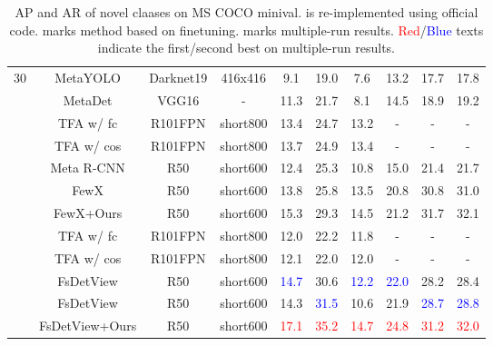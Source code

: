 \documentclass[10pt,twocolumn,letterpaper]{article}
\begin{document}
\begin{table*}
\begin{center}
\begin{tabular}{|c|c|c|c|c|c|c|c|c|c|}
\multirow{11}{*}{30} &  MetaYOLO \cite{kang2019few}   & Darknet19 & 416x416 & 9.1 & 19.0 & 7.6 & 13.2 & 17.7 & 17.8 \\
& MetaDet \cite{wang2019meta}  & VGG16 & - & 11.3 & 21.7 & 8.1 & 14.5 & 18.9 & 19.2 \\
&  TFA w/ fc  \cite{wang2020frustratingly} & R101FPN & short800 & 13.4 & 24.7 & 13.2 & - & - & - \\
&  TFA w/ cos  \cite{wang2020frustratingly} & R101FPN & short800 & 13.7 & 24.9 & 13.4 & - & - & - \\
& Meta R-CNN \cite{yan2019meta} & R50  & short600 & 12.4 & 25.3 & 10.8 & 15.0 & 21.4 & 21.7 \\
&  FewX \cite{fan2020fsod}   & R50 & short600 & 13.8 & 25.8 & 13.5 & 20.8 & 30.8 & 31.0 \\
\rowcolor{Gray}
\cellcolor{white} & FewX+Ours & R50 & short600 & 15.3 & 29.3 & 14.5 & 21.2 & 31.7 & 32.1 \\ \cline{2-10}
&  TFA w/ fc   \cite{wang2020frustratingly} & R101FPN & short800 & 12.0 & 22.2 & 11.8 & - & - & - \\
&  TFA w/ cos   \cite{wang2020frustratingly} & R101FPN & short800 & 12.1 & 22.0 & 12.0 & - & - & - \\
&  FsDetView  \cite{xiao2020few}    & R50 & short600 & \textcolor{blue}{14.7}  & 30.6  & \textcolor{blue}{12.2} & \textcolor{blue}{22.0} & 28.2 & 28.4 \\
& FsDetView     & R50 & short600 & 14.3  & \textcolor{blue}{31.5}  & 10.6 & 21.9 & \textcolor{blue}{28.7} & \textcolor{blue}{28.8} \\
\rowcolor{Gray}
\cellcolor{white} &  FsDetView+Ours    & R50 & short600 &  \textcolor{red}{17.1} & \textcolor{red}{35.2} & \textcolor{red}{14.7}  & \textcolor{red}{24.8}& \textcolor{red}{31.2} & \textcolor{red}{32.0} \\ 

   
\hline
\end{tabular}
\end{center} 
\vspace{-0.10cm}
\caption{AP and AR of novel claases on MS COCO minival.  is re-implemented using official code.  marks method based on finetuning.  marks multiple-run results. \textcolor{red}{Red}/\textcolor{blue}{Blue} texts indicate the first/second best on multiple-run results.}
\label{table:coco_novel}
\end{table*}
\end{document}
